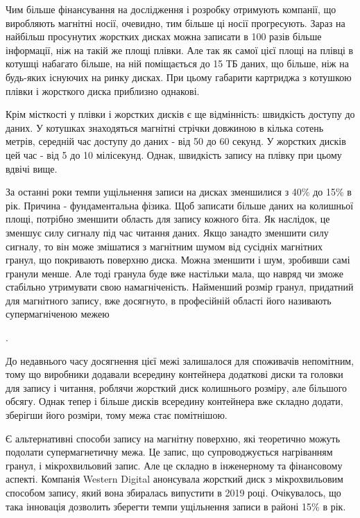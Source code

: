 \documentclass[a4paper,14pt]{extreport}
\begin{document}
Чим більше фінансування на дослідження і розробку отримують компанії, що виробляють магнітні носії, очевидно, тим більше ці носії прогресують. Зараз на найбільш просунутих жорстких дисках можна записати в 100 разів більше інформації, ніж на такій же площі плівки. Але так як самої цієї площі на плівці в котушці набагато більше, на ній поміщається до 15 ТБ даних, що більше, ніж на будь-яких існуючих на ринку дисках. При цьому габарити картриджа з котушкою плівки і жорсткого диска приблизно однакові.\par

Крім місткості у плівки і жорстких дисків є ще відмінність: швидкість доступу до даних. У котушках знаходяться магнітні стрічки довжиною в кілька сотень метрів, середній час доступу до даних - від 50 до 60 секунд. У жорстких дисків цей час - від 5 до 10 мілісекунд. Однак, швидкість запису на плівку при цьому вдвічі вище\cite{lit2}.\par

За останні роки темпи ущільнення записи на дисках зменшилися з 40\% до 15\% в рік. Причина - фундаментальна фізика. Щоб записати більше даних на колишньої площі, потрібно зменшити область для запису кожного біта. Як наслідок, це зменшує силу сигналу під час читання даних. Якщо занадто зменшити силу сигналу, то він може змішатися з магнітним шумом від сусідніх магнітних гранул, що покривають поверхню диска. Можна зменшити і шум, зробивши самі гранули менше. Але тоді гранула буде вже настільки мала, що навряд чи зможе стабільно утримувати свою намагніченість. Найменший розмір гранул, придатний для магнітного запису, вже досягнуто, в професійній області його називають супермагніченою межею\par.

До недавнього часу досягнення цієї межі залишалося для споживачів непомітним, тому що виробники додавали всередину контейнера додаткові диски та головки для запису і читання, роблячи жорсткий диск колишнього розміру, але більшого обсягу. Однак тепер і більше дисків всередину контейнера вже складно додати, зберігши його розміри, тому межа стає помітнішою.\par

Є альтернативні способи запису на магнітну поверхню, які теоретично можуть подолати супермагнетичну межа. Це запис, що супроводжується нагріванням гранул, і мікрохвильовий запис. Але це складно в інженерному та фінансовому аспекті. Компанія Western Digital анонсувала жорсткий диск з мікрохвильовим способом запису, який вона збиралась випустити в 2019 році. Очікувалось, що така інновація дозволить зберегти темпи ущільнення записи в районі 15\% в рік.\par
\end{document}
